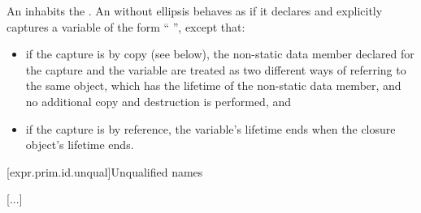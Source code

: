 \documentclass{wg21}
\begin{document}
\pnum
An  inhabits the .
An  without ellipsis
behaves as if it declares and explicitly captures a variable of
the form ``  \tcode{;}'', except that:
\begin{itemize}
    \item if the capture is by copy (see below), the non-static data member
    declared for the capture and the variable are treated as two different ways
    of referring to the same object, which has the lifetime of the non-static
    data member, and no additional copy and destruction is performed, and
    \item if the capture is by reference, the variable's lifetime ends when the
    closure object's lifetime ends.
\end{itemize}

[expr.prim.id.unqual]{Unqualified names}

[...]
\end{document}

